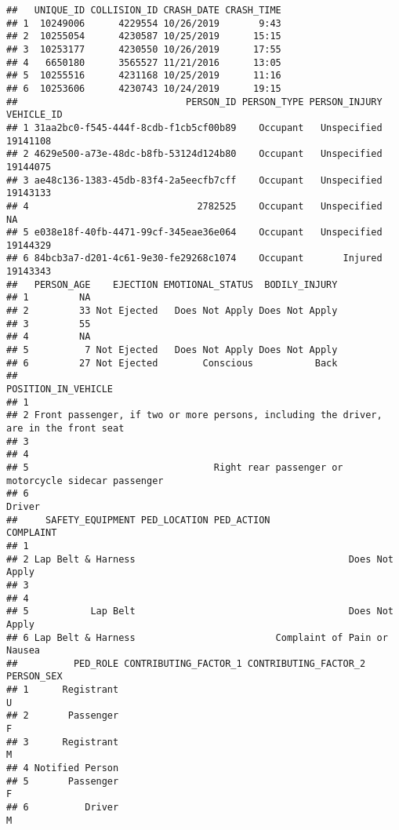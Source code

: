 \documentclass[
]{article}
\begin{document}
\begin{verbatim}
##   UNIQUE_ID COLLISION_ID CRASH_DATE CRASH_TIME
## 1  10249006      4229554 10/26/2019       9:43
## 2  10255054      4230587 10/25/2019      15:15
## 3  10253177      4230550 10/26/2019      17:55
## 4   6650180      3565527 11/21/2016      13:05
## 5  10255516      4231168 10/25/2019      11:16
## 6  10253606      4230743 10/24/2019      19:15
##                              PERSON_ID PERSON_TYPE PERSON_INJURY VEHICLE_ID
## 1 31aa2bc0-f545-444f-8cdb-f1cb5cf00b89    Occupant   Unspecified   19141108
## 2 4629e500-a73e-48dc-b8fb-53124d124b80    Occupant   Unspecified   19144075
## 3 ae48c136-1383-45db-83f4-2a5eecfb7cff    Occupant   Unspecified   19143133
## 4                              2782525    Occupant   Unspecified         NA
## 5 e038e18f-40fb-4471-99cf-345eae36e064    Occupant   Unspecified   19144329
## 6 84bcb3a7-d201-4c61-9e30-fe29268c1074    Occupant       Injured   19143343
##   PERSON_AGE    EJECTION EMOTIONAL_STATUS  BODILY_INJURY
## 1         NA                                            
## 2         33 Not Ejected   Does Not Apply Does Not Apply
## 3         55                                            
## 4         NA                                            
## 5          7 Not Ejected   Does Not Apply Does Not Apply
## 6         27 Not Ejected        Conscious           Back
##                                                                    POSITION_IN_VEHICLE
## 1                                                                                     
## 2 Front passenger, if two or more persons, including the driver, are in the front seat
## 3                                                                                     
## 4                                                                                     
## 5                                 Right rear passenger or motorcycle sidecar passenger
## 6                                                                               Driver
##     SAFETY_EQUIPMENT PED_LOCATION PED_ACTION                   COMPLAINT
## 1                                                                       
## 2 Lap Belt & Harness                                      Does Not Apply
## 3                                                                       
## 4                                                                       
## 5           Lap Belt                                      Does Not Apply
## 6 Lap Belt & Harness                         Complaint of Pain or Nausea
##          PED_ROLE CONTRIBUTING_FACTOR_1 CONTRIBUTING_FACTOR_2 PERSON_SEX
## 1      Registrant                                                      U
## 2       Passenger                                                      F
## 3      Registrant                                                      M
## 4 Notified Person                                                       
## 5       Passenger                                                      F
## 6          Driver                                                      M
\end{verbatim}
\end{document}
